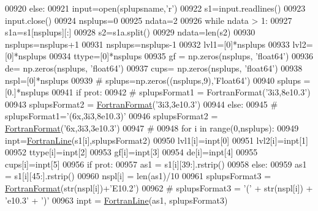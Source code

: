 \begin{DoxyCode}
00920     \textcolor{keywordflow}{else}:
00921         input=open(splupsname,\textcolor{stringliteral}{'}\textcolor{stringliteral}{r')}
00922 \textcolor{stringliteral}{        s1=input.readlines()}
00923 \textcolor{stringliteral}{        input.close()}
00924 \textcolor{stringliteral}{        nsplups=0}
00925 \textcolor{stringliteral}{        ndata=2}
00926 \textcolor{stringliteral}{        }\textcolor{keywordflow}{while} ndata > 1:
00927             s1a=s1[nsplups][:]
00928             s2=s1a.split()
00929             ndata=len(s2)
00930             nsplups=nsplups+1
00931         nsplups=nsplups-1
00932         lvl1=[0]*nsplups
00933         lvl2=[0]*nsplups
00934         ttype=[0]*nsplups
00935         gf = np.zeros(nsplups, \textcolor{stringliteral}{'float64'})
00936         de= np.zeros(nsplups, \textcolor{stringliteral}{'float64'})
00937         cups= np.zeros(nsplups, \textcolor{stringliteral}{'float64'})
00938         nspl=[0]*nsplups
00939 \textcolor{comment}{#        splups=np.zeros((nsplups,9),'Float64')}
00940         splups = [0.]*nsplups
00941         \textcolor{keywordflow}{if} prot:
00942 \textcolor{comment}{#            splupsFormat1 = FortranFormat('3i3,8e10.3')}
00943             splupsFormat2 = \hyperlink{classpyneb_1_1utils_1_1_fortran_format_1_1_fortran_format}{FortranFormat}(\textcolor{stringliteral}{'3i3,3e10.3'})
00944         \textcolor{keywordflow}{else}:
00945 \textcolor{comment}{#            splupsFormat1='(6x,3i3,8e10.3)'}
00946             splupsFormat2 = \hyperlink{classpyneb_1_1utils_1_1_fortran_format_1_1_fortran_format}{FortranFormat}(\textcolor{stringliteral}{'6x,3i3,3e10.3'})
00947         \textcolor{comment}{#}
00948         \textcolor{keywordflow}{for} i \textcolor{keywordflow}{in} range(0,nsplups):
00949             inpt=\hyperlink{classpyneb_1_1utils_1_1_fortran_format_1_1_fortran_line}{FortranLine}(s1[i],splupsFormat2)
00950             lvl1[i]=inpt[0]
00951             lvl2[i]=inpt[1]
00952             ttype[i]=inpt[2]
00953             gf[i]=inpt[3]
00954             de[i]=inpt[4]
00955             cups[i]=inpt[5]
00956             \textcolor{keywordflow}{if} prot:
00957                 as1 = s1[i][39:].rstrip()
00958             \textcolor{keywordflow}{else}:
00959                 as1 = s1[i][45:].rstrip()
00960             nspl[i] = len(as1)/10
00961             splupsFormat3 = \hyperlink{classpyneb_1_1utils_1_1_fortran_format_1_1_fortran_format}{FortranFormat}(str(nspl[i])+\textcolor{stringliteral}{'E10.2'})
00962 \textcolor{comment}{#            splupsFormat3 = '(' + str(nspl[i]) + 'e10.3' + ')'}
00963             inpt = \hyperlink{classpyneb_1_1utils_1_1_fortran_format_1_1_fortran_line}{FortranLine}(as1, splupsFormat3)

\end{DoxyCode}
